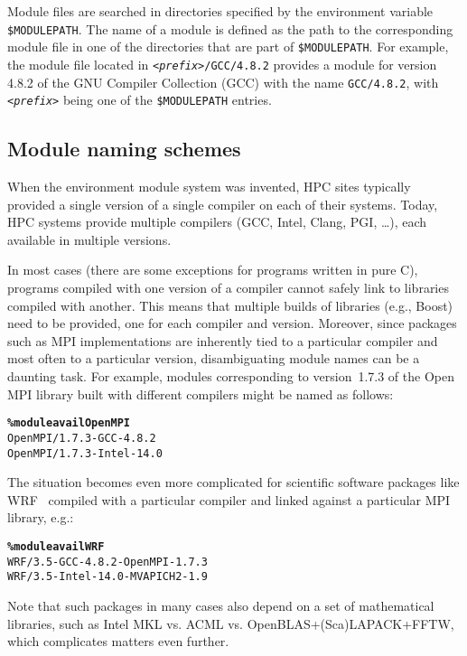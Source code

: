 Module files are searched in directories specified by the
environment variable \texttt{\small \$MODULEPATH}. The name of a module is defined
as the path to the corresponding module file in one of the directories that are
part of \texttt{\small \$MODULEPATH}. For example, the module file located in
\texttt{\small \emph{<prefix>}/GCC/4.8.2}
provides a module for version 4.8.2 of the GNU Compiler Collection (GCC) with the
name \texttt{\small GCC/4.8.2}, with \texttt{\small\emph{<prefix>}} being one of the
\texttt{\small \$MODULEPATH} entries.

\subsection{Module naming schemes}
\label{sec:Module_naming_scheme}
When the environment module system was invented, HPC sites typically provided
a single version of a single compiler on each of their systems.
Today, HPC systems provide multiple compilers (GCC, Intel,
Clang, PGI, \ldots), each available in multiple versions.

In most cases (there are some exceptions for programs written in pure C), programs
compiled with one version of a compiler cannot safely link to libraries compiled
with another. This means that multiple builds of libraries (e.g., Boost) need to be
provided, one for each compiler and version.
Moreover, since packages such as MPI implementations are inherently tied to a
particular compiler and most often to a particular version, disambiguating
module names can be a daunting task. For example, modules corresponding to
version~1.7.3 of the Open\,MPI library built with different compilers might be named
as follows:
{\small
\begin{alltt}
    \textbf{\% module avail OpenMPI}
    OpenMPI/1.7.3-GCC-4.8.2
    OpenMPI/1.7.3-Intel-14.0\
\end{alltt}
}

The situation becomes even more complicated for scientific software
packages like WRF~\cite{wrf} compiled with a particular compiler and linked
against a particular MPI library, e.g.:
{\small
\begin{alltt}
    \textbf{\% module avail WRF}
    WRF/3.5-GCC-4.8.2-OpenMPI-1.7.3
    WRF/3.5-Intel-14.0-MVAPICH2-1.9\
\end{alltt}
}
\noindent
Note that such packages in many cases also depend on a set of mathematical
libraries, such as Intel MKL vs. ACML vs. OpenBLAS+(Sca)LAPACK+FFTW, which complicates matters even further.

